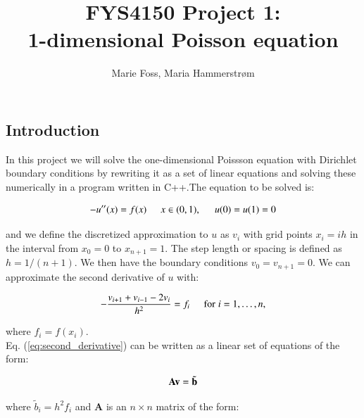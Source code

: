 \documentclass{article}
\title{\textbf{FYS4150 Project 1: \\1-dimensional Poisson equation}}
\author{Marie Foss, Maria Hammerstr{{\o}}m}
\date{} %
\begin{document}
\maketitle

\begin{abstract}
	\noindent \lipsum[1] 
	\vspace*{2ex}
\end{abstract}



\begin{multicols}{2}

\section{Introduction}
In this project we will solve the one-dimensional Poissson equation with Dirichlet boundary conditions by rewriting it as a set of linear equations and solving these numerically in a program written in C++.The equation to be solved is:

\begin{equation}\label{eq:Poisson}
	-u''(x) = f(x) \hspace{0.5cm} x\in(0,1), \hspace{0.5cm} u(0) = u(1) = 0
\end{equation}

\noindent and we define the discretized approximation  to $u$ as $v_i$  with grid points $x_i=ih$   in the interval from $x_0=0$ to $x_{n+1}=1$. The step length or spacing is defined as $h=1/(n+1)$. We then have the boundary conditions $v_0 = v_{n+1} = 0$. We can approximate the second derivative of $u$ with:

\begin{equation}\label{eq:second_derivative}
   -\frac{v_{i+1}+v_{i-1}-2v_i}{h^2} = f_i  \hspace{0.5cm} \mathrm{for} \hspace{0.1cm} i=1,\dots, n,
\end{equation}

\noindent where $f_i=f(x_i)$. \\

\noindent Eq. (\ref{eq:second_derivative}) can be written as a linear set of equations of the form: 

\begin{equation}
	{\bf A}{\bf v} = \tilde{{\bf b}}
\end{equation}

\noindent where $\tilde{b}_i=h^2f_i$ and \textbf{A} is an $n\times n$ matrix of the form:


\end{multicols}
\end{document}
